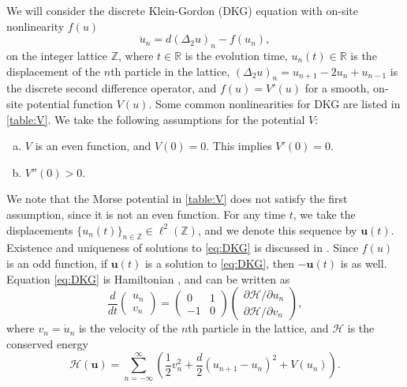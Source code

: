 \documentclass[12pt,reqno]{amsart}
\def\R{{\mathbb R}}
\def\Z{{\mathbb Z}}
\def\calH{\mathcal{H}}
\newcommand{\uvec}{\mathbf{u}}
\theoremstyle{definition}
\begin{document}
We will consider the discrete Klein-Gordon (DKG) equation with on-site nonlinearity $f(u)$
\begin{equation}\label{eq:DKG}
\ddot{u}_n = d (\Delta_2 u)_n - f(u_n),
\end{equation}
on the integer lattice $\Z$, where $t \in \R$ is the evolution time, $u_n(t) \in \R$ is the displacement of the $n$th particle in the lattice, $(\Delta_2 u)_n = u_{n+1} - 2 u_n + u_{n-1}$ is the discrete second difference operator, and $f(u) = V'(u)$ for a smooth, on-site potential function $V(u)$. Some common nonlinearities for DKG are listed in \cref{table:V}. We take the following assumptions for the potential $V$:
\begin{enumerate}[(a)]
\item $V$ is an even function, and $V(0) = 0$. This implies $V'(0) = 0$.
\item $V''(0)>0$.
\end{enumerate}
We note that the Morse potential in \cref{table:V} does not satisfy the first assumption, since it is not an even function. For any time $t$, we take the displacements $\{u_n(t)\}_{n \in \Z} \in \ell^2(\Z)$, and we denote this sequence by $\uvec(t)$. Existence and uniqueness of solutions to \cref{eq:DKG} is discussed in \cite{cuevas-maraver2016}. Since $f(u)$ is an odd function, if $\uvec(t)$ is a solution to \cref{eq:DKG}, then $-\uvec(t)$ is as well. Equation \cref{eq:DKG} is Hamiltonian \cites{KevrekidisWeinstein2000,cuevas-maraver2016}, and can be written as
\begin{equation}\label{eq:Hform}
\frac{d}{dt}\begin{pmatrix} u_n \\ v_n \end{pmatrix} = 
\begin{pmatrix} 0 & 1 \\ -1 & 0 \end{pmatrix}\begin{pmatrix} \partial \calH / \partial u_n \\ \partial \calH / \partial v_n \end{pmatrix},
\end{equation}
where $v_n = \dot{u}_n$ is the velocity of the $n$th particle in the lattice, and $\calH$ is the conserved energy
\begin{equation}\label{eq:H}
	\calH(\uvec) = \sum_{n=-\infty}^\infty 
	\left( \frac{1}{2} v_n^2 + \frac{d}{2} (u_{n+1} - u_n)^2 + V(u_n) \right).
\end{equation}
\end{document}
